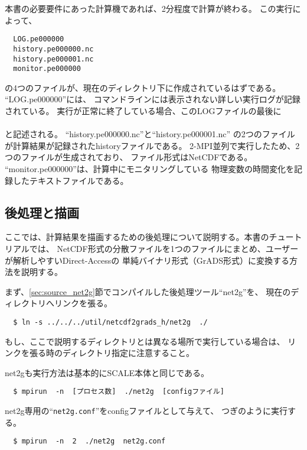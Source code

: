本書の必要要件にあった計算機であれば、2分程度で計算が終わる。
\noindent この実行によって、\\
\begin{verbatim}
  LOG.pe000000
  history.pe000000.nc
  history.pe000001.nc
  monitor.pe000000
\end{verbatim}
の4つのファイルが、現在のディレクトリ下に作成されているはずである。
``LOG.pe000000''には、
コマンドラインには表示されない詳しい実行ログが記録されている。
実行が正常に終了している場合、このLOGファイルの最後に\\

\\

\noindent と記述される。
``history.pe000000.nc''と``history.pe000001.nc''
の2つのファイルが計算結果が記録されたhistoryファイルである。
2-MPI並列で実行したため、2つのファイルが生成されており、
ファイル形式はNetCDFである。
``monitor.pe000000''は、計算中にモニタリングしている
物理変数の時間変化を記録したテキストファイルである。



\subsection{後処理と描画}
ここでは、計算結果を描画するための後処理について説明する。本書のチュートリアルでは、
NetCDF形式の分散ファイルを1つのファイルにまとめ、ユーザーが解析しやすいDirect-Accessの
単純バイナリ形式（GrADS形式）に変換する方法を説明する。

まず、\ref{sec:source_net2g}節でコンパイルした後処理ツール``net2g''を、
現在のディレクトリへリンクを張る。
\begin{verbatim}
  $ ln -s ../../../util/netcdf2grads_h/net2g  ./
\end{verbatim}
もし、ここで説明するディレクトリとは異なる場所で実行している場合は、
リンクを張る時のディレクトリ指定に注意すること。

net2gも実行方法は基本的にSCALE本体と同じである。
\begin{verbatim}
  $ mpirun  -n  [プロセス数]  ./net2g  [configファイル]
\end{verbatim}
net2g専用の``\verb|net2g.conf|''をconfigファイルとして与えて、
つぎのように実行する。
\begin{verbatim}
  $ mpirun  -n  2  ./net2g  net2g.conf
\end{verbatim}

